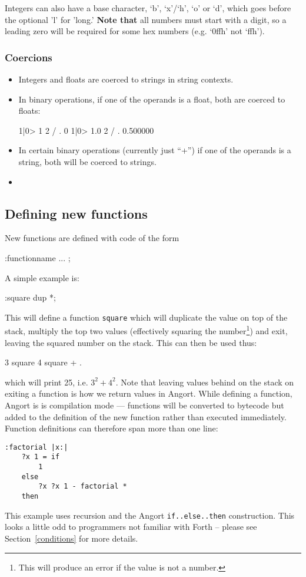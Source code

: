 Integers can also have a base character, `b', `x'/`h', `o' or `d', which
goes before the optional 'l' for 'long.' \textbf{Note that} all numbers
must start with a digit, so a leading zero will be required for some 
hex numbers (e.g. `0ffh' not `ffh').


\clearpage
\subsubsection{Coercions}
\begin{itemize}
\item Integers and floats are coerced to strings in string contexts.
\item In binary operations, if one of the operands is a float, both are coerced to floats:
\begin{v}
1|0> 1 2 / .
0
1|0> 1.0 2 / .
0.500000
\end{v}
\item In certain binary operations (currently just ``+'') if one of the operands
is a string, both will be coerced to strings.
\item {}
\end{itemize}

\subsection{Defining new functions}
New functions are defined with code of the form
\begin{v}
:functionname ... ;
\end{v}
A simple example is:
\begin{v}
:square dup *;
\end{v}
This will define a function \texttt{square} which will duplicate
the value on top of the stack, multiply the top two values
(effectively squaring the number\footnote{This will produce
an error if the value is not a number.}) and exit, leaving the
squared number on the stack. This can then be used thus:
\begin{v}
3 square 4 square + .
\end{v}
which will print 25, i.e. $3^2+4^2$. Note that leaving values behind
on the stack on exiting a function is how we return values in Angort.
While defining a function, Angort is is compilation mode --- functions will
be converted to bytecode but added to the definition of the new function
rather than executed immediately. Function definitions can therefore span
more than one line:
\begin{lstlisting}
:factorial |x:|
    ?x 1 = if
        1
    else
        ?x ?x 1 - factorial *
    then
\end{lstlisting}
This example uses recursion and the Angort \texttt{if..else..then} construction.
This looks a little odd to programmers not familiar with Forth -- please
see Section~\ref{conditions} for more details.


